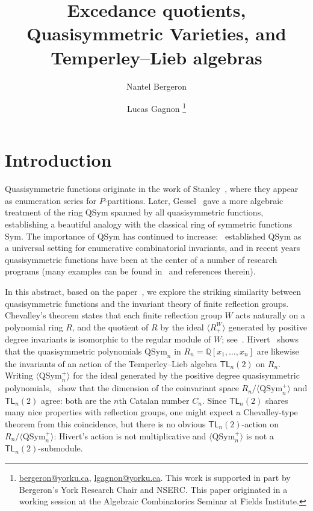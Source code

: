 \documentclass[submission]{FPSAC2024}
\title[Excedance quotients, Quasisymmetric Varieties, and $\mathsf{TL}_{n}(2)$]{Excedance quotients, Quasisymmetric Varieties, and Temperley--Lieb algebras}
\author{Nantel Bergeron \and Lucas Gagnon
\thanks{\href{mailto:bergeron@yorku.ca}{bergeron@yorku.ca}, \href{mailto:lgagnon@yorku.ca}{lgagnon@yorku.ca}. This work is supported in part by Bergeron's York Research Chair and NSERC. This paper originated in a working session at the Algebraic Combinatorics Seminar at Fields Institute.}\addressmark{1}}
\theoremstyle{definition}
\theoremstyle{remark}
\numberwithin{equation}{section}
\newcommand{\QQ}{\mathbb{Q}}
\newcommand{\TL}{\mathsf{TL}}
\newcommand{\Sym}{\mathrm{Sym}}
\newcommand{\QSym}{\mathrm{QSym}}
\begin{document}
\maketitle


\section{Introduction}

Quasisymmetric functions originate in the work of Stanley~\cite{S72}, where they appear as enumeration series for $P$-partitions.  
Later, Gessel~\cite{Gessel} gave a more algebraic treatment of the ring $\QSym$ spanned by all quasisymmetric functions, establishing a beautiful analogy with the classical ring of symmetric functions $\Sym$. 
The importance of $\QSym$ has continued to increase:~\cite{ABS} established $\QSym$ as a universal setting for enumerative combinatorial invariants, and in recent years quasisymmetric functions have been at the center of a number of research programs (many examples can be found in~\cite{Grinberg,LMvW, Mason} and references therein).

In this abstract, based on the paper~\cite{BG}, we explore the striking similarity between quasisymmetric functions and the invariant theory of finite reflection groups.  
Chevalley's theorem states that each finite reflection group $W$ acts naturally on a polynomial ring $R$, and the quotient of $R$ by the ideal $\langle R_{+}^{W} \rangle$ generated by positive degree invariants is isomorphic to the regular module of $W$; see~\cite[Chapter 3]{Humphrey}.  
Hivert~\cite{Hivert} shows that the quasisymmetric polynomials $\QSym_{n}$ in $R_{n} = \QQ[x_{1}, \ldots, x_{n}]$ are likewise the invariants of an action of the Temperley--Lieb algebra $\TL_{n}(2)$ on $R_{n}$.
Writing $\langle \QSym_{n}^{+} \rangle$
for the ideal generated by the positive degree quasisymmetric polynomials,~\cite{ABB, AB} show that the dimension of the coinvariant space $R_{n}\big/\langle \QSym_{n}^{+} \rangle$ and $\TL_{n}(2)$ agree: both are the $n$th Catalan number $C_{n}$.  
Since $\TL_{n}(2)$ shares many nice properties with reflection groups, one might expect a Chevalley-type theorem from this coincidence, but there is no obvious $\TL_{n}(2)$-action on $R_{n}\big/\langle \QSym_{n}^{+} \rangle$:  Hivert's action is not multiplicative and $\langle \QSym_{n}^{+} \rangle$ is not a $\TL_{n}(2)$-submodule.  
\end{document}
